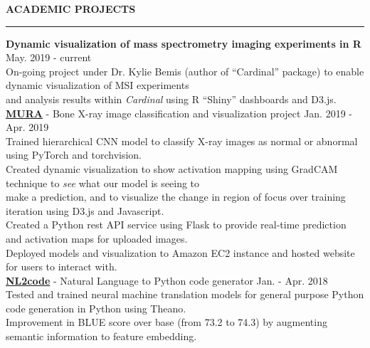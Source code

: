 \documentclass[a4paper]{article}
\newcommand{\myline}{\par
  \kern2pt %
  \hrule height 0.5pt
  \kern2pt %
}
\newcommand{\mybullet}{
	\indent \textbullet \hspace*{2mm}
}
\newcommand{\linetab}{
  \\ \hspace*{9mm}
}
\begin{document}
	
\noindent
{\large \textbf{ACADEMIC PROJECTS}}
\myline 
\smallskip

      \noindent
      \textbf{Dynamic visualization of mass spectrometry imaging experiments in R}
      \hfill May. 2019 - current \\
      \mybullet On-going project under Dr. Kylie Bemis (author of ``Cardinal'' package) to enable 
      dynamic visualization of MSI experiments \linetab and analysis results within 
      \textit{Cardinal} using R ``Shiny'' dashboards and D3.js. \\

      \noindent
      \textbf{\href{https://github.com/DarkestFloyd/DS5500Project}{MURA}} - Bone X-ray image 
      classification and visualization project \hfill Jan. 2019 - Apr. 2019 \\
      \mybullet Trained hierarchical CNN model to classify X-ray images as normal or abnormal 
      using PyTorch and torchvision. \\
      \mybullet Created dynamic visualization to show activation mapping using GradCAM technique 
      to \textit{see} what our model is seeing to \linetab make a prediction, and to visualize the 
      change in region of focus over training iteration using D3.js and Javascript. \\
      \mybullet Created a Python rest API service using Flask to provide real-time prediction and 
      activation maps for uploaded images. \\
      \mybullet Deployed models and visualization to Amazon EC2 instance and hosted website for 
      users to interact with. \\

			\noindent
      \textbf{\href{https://github.com/DarkestFloyd/NL2code}{NL2code}} - Natural Language to 
      Python code generator \hfill Jan. - Apr. 2018 \\
      \mybullet Tested and trained neural machine translation models for general purpose Python 
      code generation in Python using Theano. \\
      \mybullet Improvement in BLUE score over base (from 73.2 to 74.3) by augmenting semantic 
      information to feature embedding. \\
\end{document}
